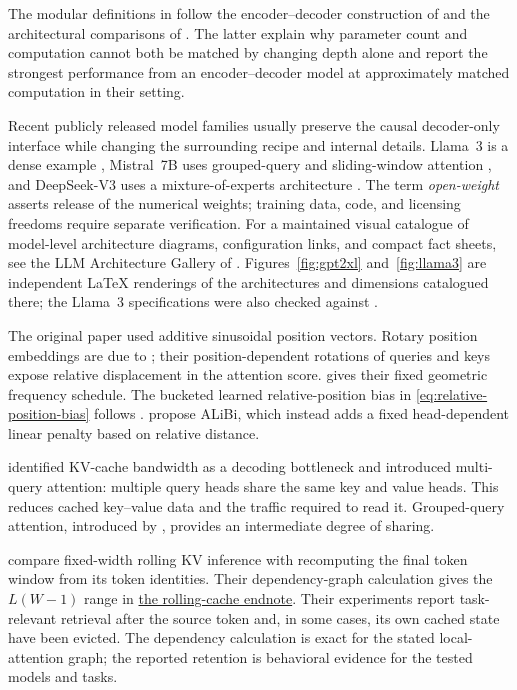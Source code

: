 \documentclass[11pt,twoside]{article}
\theoremstyle{plain}
\theoremstyle{definition}
\theoremstyle{remark}
\begin{document}
The modular definitions in  follow
the encoder--decoder construction of \citet{vaswani2017} and the architectural
comparisons of \citet{raffel2020}. The latter explain why parameter count and
computation cannot both be matched by changing depth alone and report the
strongest performance from an encoder--decoder model at approximately matched
computation in their setting.

Recent publicly released model families usually preserve the causal
decoder-only interface while changing the surrounding recipe and internal
details. Llama~3 is a dense example \citep{grattafiori2024}, Mistral~7B uses
grouped-query and sliding-window attention \citep{jiang2023}, and DeepSeek-V3
uses a mixture-of-experts architecture \citep{deepseek2024}. The term
\emph{open-weight} asserts release of the numerical weights; training data,
code, and licensing freedoms require separate verification.
For a maintained visual catalogue of model-level architecture diagrams,
configuration links, and compact fact sheets, see the LLM Architecture Gallery
of \citet{raschka2026gallery}.
Figures~\ref{fig:gpt2xl} and~\ref{fig:llama3} are independent LaTeX
renderings of the architectures and dimensions catalogued there; the
Llama~3 specifications were also checked against \citet{grattafiori2024}.

The original paper used additive sinusoidal position vectors. Rotary position embeddings
are due to \citet{su2021}; their position-dependent rotations of queries and
keys expose relative displacement in the attention score.
 gives their fixed geometric frequency schedule.
The bucketed learned
relative-position bias in \eqref{eq:relative-position-bias} follows
\citet{raffel2020}. \citet{press2022} propose ALiBi, which instead adds a fixed
head-dependent linear penalty based on relative distance.

\citet{shazeer2019} identified KV-cache bandwidth as a decoding bottleneck and
introduced multi-query attention: multiple query heads share the same key and
value heads. This reduces cached key--value data and the traffic required to
read it. Grouped-query attention, introduced by \citet{ainslie2023}, provides
an intermediate degree of sharing.

\citet{delise2026} compare fixed-width rolling KV inference with recomputing
the final token window from its token identities. Their dependency-graph
calculation gives the \(L(W-1)\) range in
\hyperref[en:rolling-kv]{the rolling-cache endnote}. Their experiments report
task-relevant retrieval after the source token and, in some cases, its own
cached state have been evicted. The dependency calculation is exact for the
stated local-attention graph; the reported retention is behavioral evidence
for the tested models and tasks.
\end{document}
